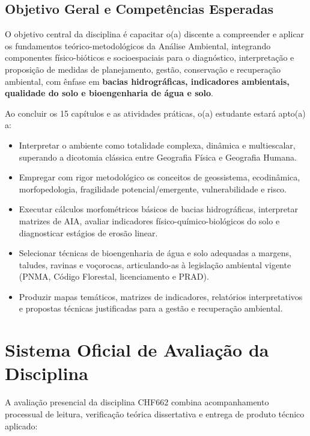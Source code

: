 \subsection*{Objetivo Geral e Competências Esperadas}

O objetivo central da disciplina é capacitar o(a) discente a compreender e aplicar os fundamentos teórico-metodológicos da Análise Ambiental, integrando componentes físico-bióticos e socioespaciais para o diagnóstico, interpretação e proposição de medidas de planejamento, gestão, conservação e recuperação ambiental, com ênfase em \textbf{bacias hidrográficas, indicadores ambientais, qualidade do solo e bioengenharia de água e solo}.

Ao concluir os 15 capítulos e as atividades práticas, o(a) estudante estará apto(a) a:
\begin{itemize}[leftmargin=1.5em, itemsep=2pt]
  \item Interpretar o ambiente como totalidade complexa, dinâmica e multiescalar, superando a dicotomia clássica entre Geografia Física e Geografia Humana.
  \item Empregar com rigor metodológico os conceitos de geossistema, ecodinâmica, morfopedologia, fragilidade potencial/emergente, vulnerabilidade e risco.
  \item Executar cálculos morfométricos básicos de bacias hidrográficas, interpretar matrizes de AIA, avaliar indicadores físico-químico-biológicos do solo e diagnosticar estágios de erosão linear.
  \item Selecionar técnicas de bioengenharia de água e solo adequadas a margens, taludes, ravinas e voçorocas, articulando-as à legislação ambiental vigente (PNMA, Código Florestal, licenciamento e PRAD).
  \item Produzir mapas temáticos, matrizes de indicadores, relatórios interpretativos e propostas técnicas justificadas para a gestão e recuperação ambiental.
\end{itemize}

\section*{Sistema Oficial de Avaliação da Disciplina}

A avaliação presencial da disciplina CHF662 combina acompanhamento processual de leitura, verificação teórica dissertativa e entrega de produto técnico aplicado:

